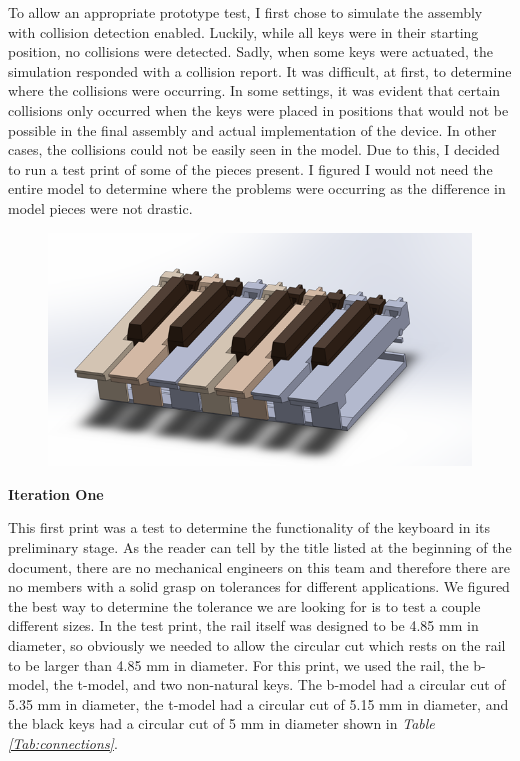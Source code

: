 To allow an appropriate prototype test, I first chose to simulate the assembly with collision detection enabled. Luckily, while all keys were in their starting position, no collisions were detected. Sadly, when some keys were actuated, the simulation responded with a collision report. It was difficult, at first, to determine where the collisions were occurring. In some settings, it was evident that certain collisions only occurred when the keys were placed in positions that would not be possible in the final assembly and actual implementation of the device. In other cases, the collisions could not be easily seen in the model. Due to this, I decided to run a test print of some of the pieces present. I figured I would not need the entire model to determine where the problems were occurring as the difference in model pieces were not drastic.

\begin{figure}[h!]
  \centering
  \includegraphics[width=0.9\linewidth]{image/AssembledModel.png}
  \caption{}
  \label{fig:assembled_model}
\end{figure}

\textbf{Iteration One}

This first print was a test to determine the functionality of the keyboard in its preliminary stage. As the reader can tell by the title listed at the beginning of the document, there are no mechanical engineers on this team and therefore there are no members with a solid grasp on tolerances for different applications. We figured the best way to determine the tolerance we are looking for is to test a couple different sizes. In the test print, the rail itself was designed to be 4.85 mm in diameter, so obviously we needed to allow the circular cut which rests on the rail to be larger than 4.85 mm in diameter. For this print, we used the rail, the b-model, the t-model, and two non-natural keys. The b-model had a circular cut of 5.35 mm in diameter, the t-model had a circular cut of 5.15 mm in diameter, and the black keys had a circular cut of 5 mm in diameter shown in \textit{Table \ref{Tab:connections}}.

